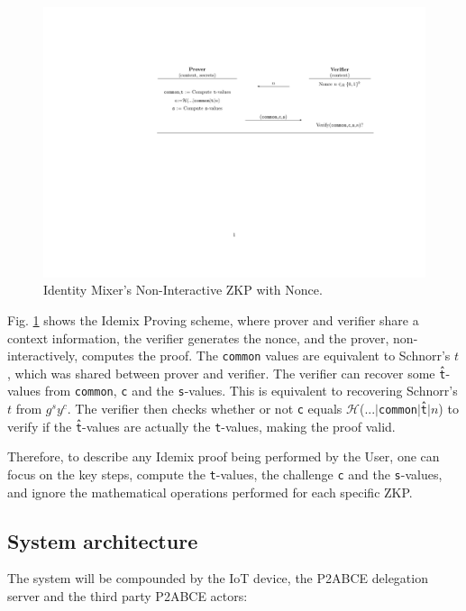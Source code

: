 \begin{figure}[bth]
	\includegraphics[width=\linewidth]{gfx/niZKPnonce}
		\caption{Identity Mixer's Non-Interactive ZKP with Nonce.}
	\label{fig:niZKPnonce}
\end{figure}

Fig. \ref{fig:niZKPnonce} shows the Idemix Proving scheme, where prover and verifier share a context information, the verifier generates the nonce, and the prover, non-interactively, computes the proof. The \texttt{common} values are equivalent to Schnorr's $t$, which was shared between prover and verifier. The verifier can recover some \texttt{\^t}-values from \texttt{common}, \texttt{c} and the \texttt{s}-values. This is equivalent to recovering Schnorr's $t$ from $g^{s} y^c$. The verifier then checks whether or not \texttt{c} equals $\mathcal{H}$(...$\mid$\texttt{common}$\mid$\texttt{\^t}$\mid$$n$) to verify if the \texttt{\^t}-values are actually the \texttt{t}-values, making the proof valid.


Therefore, to describe any Idemix proof being performed by the User, one can focus on the key steps, compute the \texttt{t}-values, the challenge \texttt{c} and the \texttt{s}-values, and ignore the mathematical operations performed for each specific ZKP.



\subsection{System architecture}

The system will be compounded by the IoT device, the P2ABCE delegation server and the third party P2ABCE actors:

